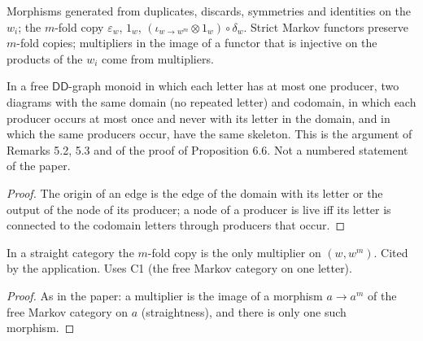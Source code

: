 \begin{definition}
\label{def:5.1}
\leanok
{}
Morphisms generated from duplicates, discards, symmetries and identities on the
$w_i$; the $m$-fold copy $\varepsilon_w$, $1_w$, $(\iota_{w \to w^m} \otimes 1_w) \circ \delta_w$.
Strict Markov functors preserve $m$-fold copies; multipliers in the image of a functor that
is injective on the products of the $w_i$ come from multipliers.
\end{definition}

\begin{lemma}
\label{lem:5.labels}
\leanok
{}
In a free $\mathsf{DD}$-graph monoid in which each letter has at most one producer, two
diagrams with the same domain (no repeated letter) and codomain, in which each producer
occurs at most once and never with its letter in the domain, and in which the same
producers occur, have the same skeleton. This is the argument of Remarks 5.2, 5.3 and of
the proof of Proposition 6.6. Not a numbered statement of the paper.
\end{lemma}
\begin{proof}
\leanok
The origin of an edge is the edge of the domain with its letter or the output of the
node of its producer; a node of a producer is live iff its letter is connected to the
codomain letters through producers that occur.
\end{proof}

\begin{remark}[Remark 5.2]
\label{rem:5.2}
\leanok
{}
In a straight category the $m$-fold copy is the only multiplier on $(w, w^m)$. Cited by
the application. Uses C1 (the free Markov category on one letter).
\end{remark}
\begin{proof}
\leanok
As in the paper: a multiplier is the image of a morphism $a \to a^m$ of the free Markov
category on $a$ (straightness), and there is only one such morphism.
\end{proof}

